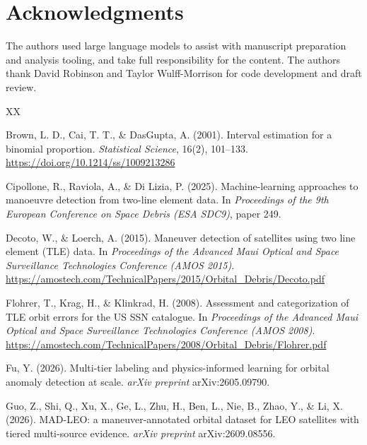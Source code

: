 \documentclass[11pt]{article}
\begin{document}

\section*{Acknowledgments}

The authors used large language models to assist with manuscript preparation and analysis tooling, and take full responsibility for the content. The authors thank David Robinson and Taylor Wulff-Morrison for code development and draft review.

\begin{thebibliography}{XX}

 Brown, L. D., Cai, T. T., \& DasGupta, A. (2001). Interval estimation for a binomial proportion. \emph{Statistical Science}, 16(2), 101--133. \url{https://doi.org/10.1214/ss/1009213286}

 Cipollone, R., Raviola, A., \& Di Lizia, P. (2025). Machine-learning approaches to manoeuvre detection from two-line element data. In \emph{Proceedings of the 9th European Conference on Space Debris (ESA SDC9)}, paper 249.

 Decoto, W., \& Loerch, A. (2015). Maneuver detection of satellites using two line element (TLE) data. In \emph{Proceedings of the Advanced Maui Optical and Space Surveillance Technologies Conference (AMOS 2015)}. \url{https://amostech.com/TechnicalPapers/2015/Orbital_Debris/Decoto.pdf}

 Flohrer, T., Krag, H., \& Klinkrad, H. (2008). Assessment and categorization of TLE orbit errors for the US SSN catalogue. In \emph{Proceedings of the Advanced Maui Optical and Space Surveillance Technologies Conference (AMOS 2008)}. \url{https://amostech.com/TechnicalPapers/2008/Orbital_Debris/Flohrer.pdf}

 Fu, Y. (2026). Multi-tier labeling and physics-informed learning for orbital anomaly detection at scale. \emph{arXiv preprint} arXiv:2605.09790.

 Guo, Z., Shi, Q., Xu, X., Ge, L., Zhu, H., Ben, L., Nie, B., Zhao, Y., \& Li, X. (2026). MAD-LEO: a maneuver-annotated orbital dataset for LEO satellites with tiered multi-source evidence. \emph{arXiv preprint} arXiv:2609.08556.


\end{thebibliography}
\end{document}
